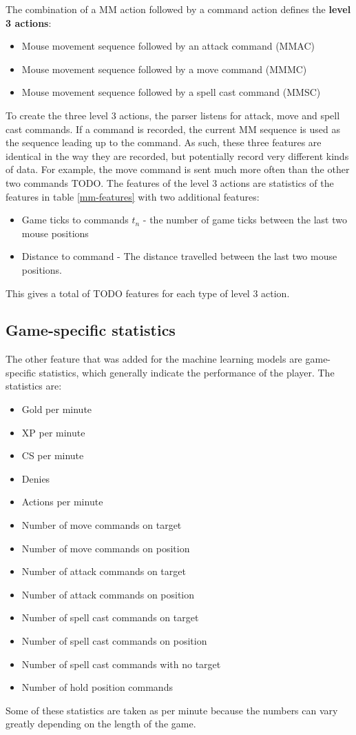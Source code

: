\documentclass{../sty/SizheArticle}
\begin{document}
The combination of a MM action followed by a command action defines the \textbf{level 3 actions}:
\begin{itemize}
\item Mouse movement sequence followed by an attack command (MMAC)
\item Mouse movement sequence followed by a move command (MMMC)
\item Mouse movement sequence followed by a spell cast command (MMSC)
\end{itemize}
To create the three level 3 actions, the parser listens for attack, move and spell cast commands. If a command is recorded, the current MM sequence is used as the sequence leading up to the command. As such, these three features are identical in the way they are recorded, but potentially record very different kinds of data. For example, the move command is sent much more often than the other two commands TODO. The features of the level 3 actions are statistics of the features in table \ref{mm-features} with two additional features:
\begin{itemize}
\item Game ticks to commands $t_n$ - the number of game ticks between the last two mouse positions
\item Distance to command - The distance travelled between the last two mouse positions. 
\end{itemize}

This gives a total of TODO features for each type of level 3 action. 


\subsection{Game-specific statistics}
The other feature that was added for the machine learning models are game-specific statistics, which generally indicate the performance of the player. The statistics are:
\begin{itemize}
\item Gold per minute
\item XP per minute
\item CS per minute
\item Denies
\item Actions per minute
\item Number of move commands on target
\item Number of move commands on position
\item Number of attack commands on target
\item Number of attack commands on position
\item Number of spell cast commands on target
\item Number of spell cast commands on position
\item Number of spell cast commands with no target
\item Number of hold position commands
\end{itemize}
Some of these statistics are taken as per minute because the numbers can vary greatly depending on the length of the game. 
\end{document}

